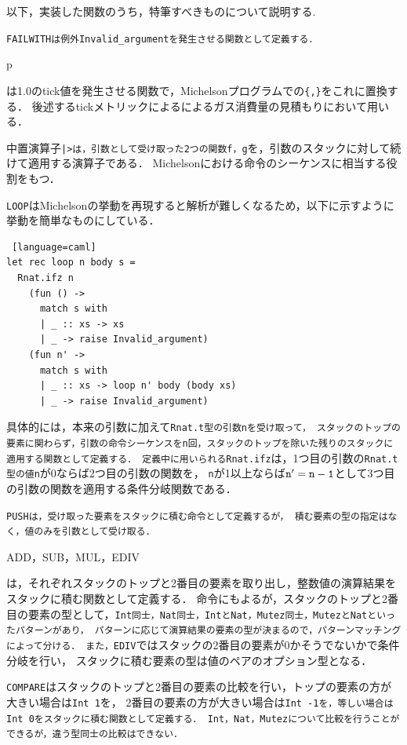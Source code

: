 \documentclass{kuisthesis}
\begin{document}
以下，実装した関数のうち，特筆すべきものについて説明する.
\begin{itemize}
  \item {\tt FAILWITHは例外Invalid\_argumentを発生させる関数として定義する．
  \item p}は1.0のtick値を発生させる関数で，Michelsonプログラムでの{\tt \{,\}}をこれに置換する．
  後述するtickメトリックによるによるガス消費量の見積もりにおいて用いる．
  \item 中置演算子{\tt |>は，引数として受け取った2つの関数f，g}を，引数のスタックに対して続けて適用する演算子である．
  Michelsonにおける命令のシーケンスに相当する役割をもつ．
  \item {\tt LOOP}はMichelsonの挙動を再現すると解析が難しくなるため，以下に示すように
  挙動を簡単なものにしている．
  \begin{lstlisting} [language=caml]
let rec loop n body s =
  Rnat.ifz n
    (fun () ->
      match s with
      | _ :: xs -> xs
      | _ -> raise Invalid_argument)
    (fun n' ->
      match s with
      | _ :: xs -> loop n' body (body xs)
      | _ -> raise Invalid_argument)
  \end{lstlisting}
  具体的には，本来の引数に加えて{\tt Rnat.t型の引数nを受け取って，
  スタックのトップの要素に関わらず，引数の命令シーケンスをn回，スタックのトップを除いた残りのスタックに適用する関数として定義する．
  定義中に用いられるRnat.ifz}は，1つ目の引数の{\tt Rnat.t型の値n}が0ならば2つ目の引数の関数を，
  {\tt n}が1以上ならば${\tt n'=n-1}$として3つ目の引数の関数を適用する条件分岐関数である．
  \item {\tt PUSHは，受け取った要素をスタックに積む命令として定義するが，
  積む要素の型の指定はなく，値のみを引数として受け取る．
  \item ADD，SUB，MUL，EDIV}は，それぞれスタックのトップと2番目の要素を取り出し，整数値の演算結果をスタックに積む関数として定義する．
  命令にもよるが，スタックのトップと2番目の要素の型として，{\tt Int同士，Nat同士，IntとNat，Mutez同士，MutezとNatといったパターンがあり，
  パターンに応じて演算結果の要素の型が決まるので，パターンマッチングによって分ける．
  また，EDIV}ではスタックの2番目の要素が0かそうでないかで条件分岐を行い，
  スタックに積む要素の型は値のペアのオプション型となる．
  \item {\tt COMPARE}はスタックのトップと2番目の要素の比較を行い，トップの要素の方が大きい場合は{\tt Int 1}を，
  2番目の要素の方が大きい場合は{\tt Int -1を，等しい場合はInt 0をスタックに積む関数として定義する．
  Int，Nat，Mutezについて比較を行うことができるが，違う型同士の比較はできない．
}
\end{itemize}
\end{document}
